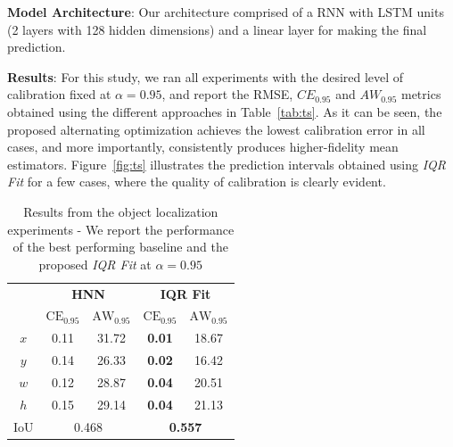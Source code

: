 \documentclass[letterpaper]{article} %
\begin{document}
\noindent \textbf{Model Architecture}: Our architecture comprised of a RNN with LSTM units (2 layers with 128 hidden dimensions) and a linear layer for making the final prediction.

\noindent \textbf{Results}: For this study, we ran all experiments with the desired level of calibration fixed at $\alpha = 0.95$, and report the RMSE, $CE_{0.95}$ and $AW_{0.95}$ metrics obtained using the different approaches in Table~\ref{tab:ts}. As it can be seen, the proposed alternating optimization achieves the lowest calibration error in all cases, and more importantly, consistently produces higher-fidelity mean estimators. Figure~\ref{fig:ts} illustrates the prediction intervals obtained using \textit{IQR Fit} for a few cases, where the quality of calibration is clearly evident.

\begin{table}[t]
	\centering
	\renewcommand*{\arraystretch}{1.3}
	\caption{Results from the object localization experiments - We report the performance of the best performing baseline and the proposed \textit{IQR Fit} at $\alpha = 0.95$}
	\begin{tabular}{|c|c|c|c|c|}
		\hline
		& \multicolumn{2}{c|}{ \textbf{HNN} } & \multicolumn{2}{c|}{ \textbf{IQR Fit} } \\ \cline{2-5}
		& $\text{CE}_{0.95}$ & $\text{AW}_{0.95}$ & $\text{CE}_{0.95}$ & $\text{AW}_{0.95}$  \\ \hline
		$x$ & 0.11 & 31.72 & \textbf{0.01} & 18.67 \\
		$y$ & 0.14 & 26.33 & \textbf{0.02} & 16.42 \\
		$w$ & 0.12 & 28.87 & \textbf{0.04} & 20.51 \\
		$h$ & 0.15 & 29.14 & \textbf{0.04} & 21.13 \\
		\hline
		\rowcolor{gray!15} IoU & \multicolumn{2}{c|}{0.468} & \multicolumn{2}{c|}{\textbf{0.557}} \\
		\hline
	\end{tabular}
	\label{tab:obj}
\end{table}
\end{document}
